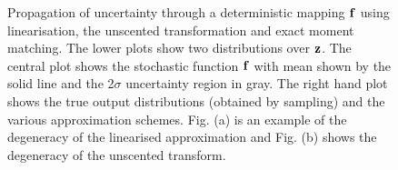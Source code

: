 \begin{figure}
{
\label{fig:propLinUnsB}
}
\caption{Propagation of uncertainty through a deterministic mapping $\mathbf{f}$ using linearisation, the unscented transformation and exact moment matching. The lower plots show two distributions over $\mathbf{z}$. The central plot shows the stochastic function $\mathbf{f}$ with mean shown by the solid line and the 2$\sigma$ uncertainty region in gray. The right hand plot shows the true output distributions (obtained by sampling) and the various approximation schemes. Fig.$\!$ (a) is an example of the degeneracy of the linearised approximation and Fig.$\!$ (b) shows the degeneracy of the unscented transform.}
\label{fig:propLinUns}
\end{figure}


